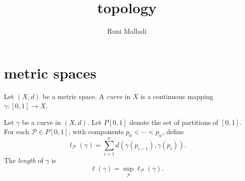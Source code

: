 \documentclass[12pt]{article}
\title{topology}
\author{Runi Malladi}
\begin{document}
\maketitle

\section{metric spaces} %

\begin{definition}
	Let $(X,d)$ be a metric space. A \emph{curve} in $X$ is a continuous mapping $\gamma: [0,1] \to X$. 
\end{definition}

\begin{definition}
	Let $\gamma$ be a curve in $(X,d)$. Let $P[0,1]$ denote the set of partitions of $[0,1]$. For each $\mathcal{P}\in P[0,1]$, with components $p_0 < \cdots < p_n$, define 
	\begin{equation*}
		\ell_\mathcal{P}(\gamma) = \sum_{i=1}^n d(\gamma(p_{i-1}), \gamma(p_i)).
	\end{equation*}
	The \emph{length} of $\gamma$ is 
	\begin{equation*}
		\ell(\gamma) = \sup_\mathcal{P} \ell_\mathcal{P}(\gamma).
	\end{equation*}
\end{definition}
\end{document}
